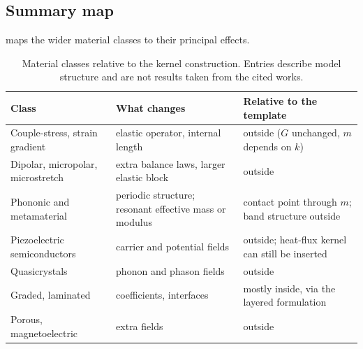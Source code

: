 \subsection{Summary map}
 maps the wider material classes to their principal effects.
\begin{table}[ht]
\centering\small
\begin{tabularx}{\textwidth}{@{}>{\raggedright\arraybackslash}p{3.6cm}YY@{}}
\toprule
Class & What changes & Relative to the template \\
\midrule
Couple-stress, strain gradient & elastic operator, internal length & outside ($G$ unchanged, $m$ depends on $k$) \\
Dipolar, micropolar, microstretch & extra balance laws, larger elastic block & outside \\
Phononic and metamaterial & periodic structure; resonant effective mass or modulus & contact point through $m$; band structure outside \\
Piezoelectric semiconductors & carrier and potential fields & outside; heat-flux kernel can still be inserted \\
Quasicrystals & phonon and phason fields & outside \\
Graded, laminated & coefficients, interfaces & mostly inside, via the layered formulation \\
Porous, magnetoelectric & extra fields & outside \\
\bottomrule
\end{tabularx}
\caption{Material classes relative to the kernel construction. Entries describe model structure and are not results taken from the cited works.}\label{tab:wider}
\end{table}
